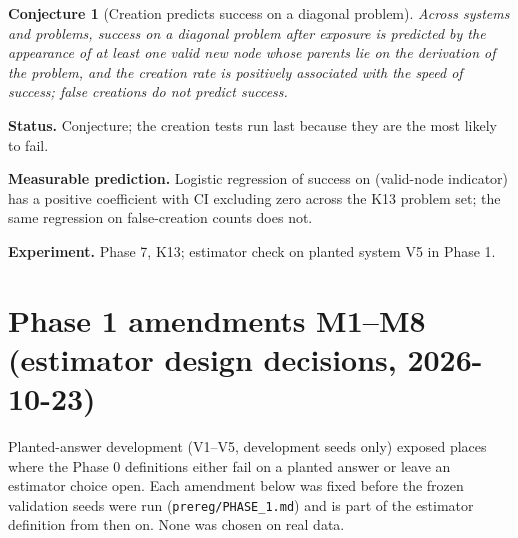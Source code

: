 \documentclass[11pt]{article}
\theoremstyle{definition}
\theoremstyle{plain}
\newtheorem{conjecture}[definition]{Conjecture}
\theoremstyle{remark}
\newcommand{\status}[1]{\par\noindent\textbf{Status.} #1}
\newcommand{\predict}[1]{\par\noindent\textbf{Measurable prediction.} #1}
\newcommand{\experiment}[1]{\par\noindent\textbf{Experiment.} #1\par\medskip}
\begin{document}
\begin{conjecture}[Creation predicts success on a diagonal problem]
\label{conj:creation}
Across systems and problems, success on a diagonal problem after exposure is
predicted by the appearance of at least one valid new node whose parents lie
on the derivation of the problem, and the creation rate is positively
associated with the speed of success; false creations do not predict success.
\end{conjecture}
\status{Conjecture; the creation tests run last because they are the most
likely to fail.}
\predict{Logistic regression of success on (valid-node indicator) has a
positive coefficient with CI excluding zero across the K13 problem set; the
same regression on false-creation counts does not.}
\experiment{Phase 7, K13; estimator check on planted system V5 in Phase 1.}


\section{Phase 1 amendments M1--M8 (estimator design decisions, 2026-10-23)}
\label{sec:amend}

Planted-answer development (V1--V5, development seeds only) exposed places
where the Phase 0 definitions either fail on a planted answer or leave an
estimator choice open. Each amendment below was fixed before the frozen
validation seeds were run (\texttt{prereg/PHASE\_1.md}) and is part of the
estimator definition from then on. None was chosen on real data.
\end{document}
